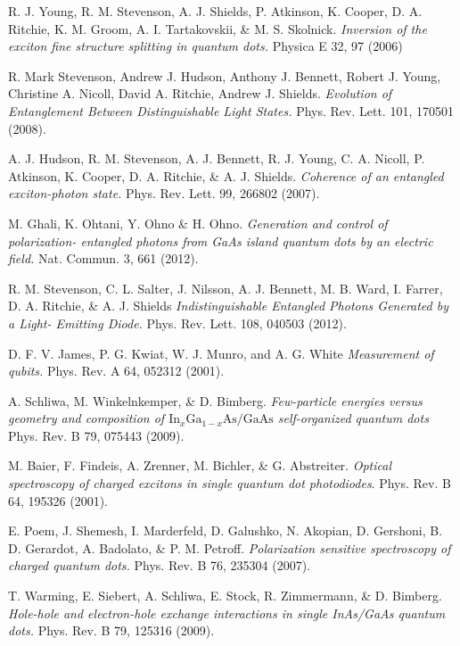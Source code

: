 \documentclass[12pt, twoside]{article}
\numberwithin{equation}{section}
\begin{document}
\begin{thebibliography}{99}
  R. J. Young, R. M. Stevenson, A. J. Shields, P. Atkinson, K. Cooper, D. A. Ritchie, K. M. Groom, A. I. Tartakovskii, \& M. S. Skolnick.
  \emph{Inversion of the exciton fine structure splitting in quantum dots.} Physica E 
  32, 
  97 (2006)

  R. Mark Stevenson, Andrew J. Hudson, Anthony J. Bennett, Robert J. Young, Christine A. Nicoll, David A. Ritchie, Andrew J. Shields.
  \emph{Evolution of Entanglement Between Distinguishable Light States. }
  Phys. Rev. Lett. 
  101, 
  170501 (2008).

  A. J. Hudson, R. M. Stevenson, A. J. Bennett, R. J. Young, C. A. Nicoll, P. Atkinson, K. Cooper, D. A. Ritchie, \& A. J. Shields.
  \emph{Coherence of an entangled exciton-photon state. }
  Phys. Rev. Lett. 
  99, 
  266802 (2007).

  M. Ghali, K. Ohtani, Y. Ohno \& H. Ohno.
  \emph{Generation and control of polarization- entangled photons from GaAs island quantum dots by an electric field. }
  Nat. Commun.
  3, 
  661 (2012).

  R. M. Stevenson, C. L. Salter, J. Nilsson, A. J. Bennett, M. B. Ward, I. Farrer, D. A. Ritchie, \& A. J. Shields
  \emph{Indistinguishable Entangled Photons Generated by a Light- Emitting Diode.}
  Phys. Rev. Lett.
  108, 
  040503  (2012).

  D. F. V. James, P. G. Kwiat, W. J. Munro, and A. G. White
  \emph{Measurement of qubits. }
  Phys. Rev. A 
  64, 
  052312 (2001).

  A. Schliwa, M. Winkelnkemper, \& D. Bimberg.
  \emph{Few-particle energies versus geometry and composition of $\text{In}_x\text{Ga}_{1-x}\text{As/GaAs}$ self-organized quantum dots}
  Phys. Rev. B 
  79, 
  075443 (2009).

  M. Baier, F. Findeis, A. Zrenner, M. Bichler, \& G. Abstreiter.
  \emph{Optical spectroscopy of charged excitons in single quantum dot photodiodes}.
  Phys. Rev. B 
  64, 
  195326 (2001).

  E. Poem, J. Shemesh, I. Marderfeld, D. Galushko, N. Akopian, D. Gershoni, B. D. Gerardot, A. Badolato, \& P. M. Petroff. 
  \emph{Polarization sensitive spectroscopy of charged quantum dots.}
  Phys. Rev. B 
  76, 
  235304 (2007).

  T. Warming, E. Siebert, A. Schliwa, E. Stock, R. Zimmermann, \& D. Bimberg.
  \emph{Hole-hole and electron-hole exchange interactions in single InAs/GaAs quantum dots.}
  Phys. Rev. B 
  79, 
  125316 (2009).
  

\end{thebibliography}
\end{document}
